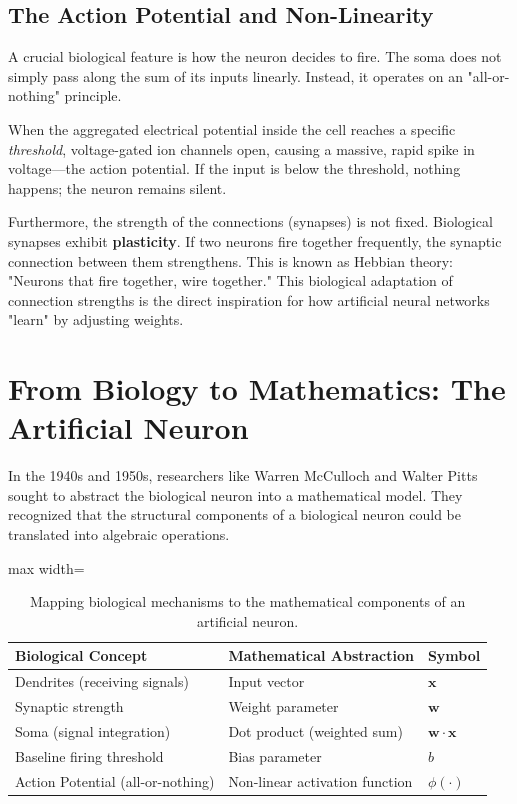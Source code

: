 \documentclass{tufte-handout}
\begin{document}
\subsection{The Action Potential and Non-Linearity}

A crucial biological feature is how the neuron decides to fire. The soma does not simply pass along the sum of its inputs linearly. Instead, it operates on an "all-or-nothing" principle.

When the aggregated electrical potential inside the cell reaches a specific \textit{threshold}, voltage-gated ion channels open, causing a massive, rapid spike in voltage—the action potential. If the input is below the threshold, nothing happens; the neuron remains silent.

Furthermore, the strength of the connections (synapses) is not fixed. Biological synapses exhibit \textbf{plasticity}. If two neurons fire together frequently, the synaptic connection between them strengthens. This is known as Hebbian theory: "Neurons that fire together, wire together." This biological adaptation of connection strengths is the direct inspiration for how artificial neural networks "learn" by adjusting weights.

\section{From Biology to Mathematics: The Artificial Neuron}

In the 1940s and 1950s, researchers like Warren McCulloch and Walter Pitts sought to abstract the biological neuron into a mathematical model. They recognized that the structural components of a biological neuron could be translated into algebraic operations.

\begin{table}[h]
\centering
\begin{adjustbox}{max width=\textwidth}
\begin{tabular}{@{}lll@{}}
\toprule
\textbf{Biological Concept} & \textbf{Mathematical Abstraction} & \textbf{Symbol} \\ \midrule
Dendrites (receiving signals) & Input vector & $\mathbf{x}$ \\
Synaptic strength & Weight parameter & $\mathbf{w}$ \\
Soma (signal integration) & Dot product (weighted sum) & $\mathbf{w} \cdot \mathbf{x}$ \\
Baseline firing threshold & Bias parameter & $b$ \\
Action Potential (all-or-nothing) & Non-linear activation function & $\phi(\cdot)$ \\ \bottomrule
\end{tabular}
\end{adjustbox}
\caption{Mapping biological mechanisms to the mathematical components of an artificial neuron.}
\label{tab:bio_to_math}
\end{table}
\end{document}
